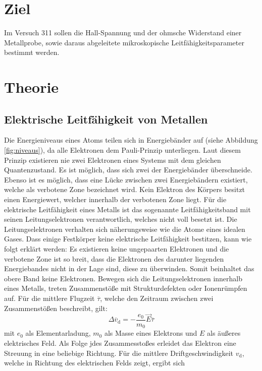 \section{Ziel}
\label{sec:Ziel}
Im Versuch 311 sollen die Hall-Spannung und der ohmsche Widerstand einer Metallprobe, sowie daraus abgeleitete mikroskopische Leitfähigkeitsparameter bestimmt werden.

\section{Theorie}
\label{sec:theorie}

\subsection{Elektrische Leitfähigkeit von Metallen}
Die Energieniveaus eines Atoms teilen sich in Energiebänder auf (siehe Abbildung \ref{fig:niveaus}), da alle Elektronen dem Pauli-Prinzip unterliegen. Laut diesem Prinzip existieren nie zwei Elektronen eines Systems mit dem gleichen Quantenzustand.
Es ist möglich, dass sich zwei der Energiebänder überschneide. Ebenso ist es möglich, dass eine Lücke zwischen zwei Energiebändern existiert, welche als verbotene Zone bezeichnet wird. Kein Elektron des Körpers besitzt einen Energiewert, welcher innerhalb der verbotenen Zone liegt.
Für die elektrische Leitfähigkeit eines Metalls ist das sogenannte Leitfähigkeitsband  mit seinen Leitungselektronen verantwortlich, welches nicht voll besetzt ist. Die Leitungselektronen verhalten sich näherungsweise wie die Atome eines idealen Gases. Dass einige Festkörper keine elektrische Leitfähigkeit bestitzen, kann wie folgt erklärt werden: Es existieren keine ungepaarten Elektronen und die verbotene Zone ist so breit, dass die Elektronen des darunter liegenden Energiebandes nicht in der Lage sind, diese zu überwinden. Somit beinhaltet das obere Band keine Elektronen.
Bewegen sich die Leitungselektronen innerhalb eines Metalls, treten Zusammenstöße mit Strukturdefekten oder Ionenrümpfen auf. Für die mittlere Flugzeit $\overline{\tau}$, welche den Zeitraum zwischen zwei Zusammenstößen beschreibt, gilt:
\begin{equation}
\Delta\overline{v}_\mathrm{d}=-\frac{e_0}{m_0}\vec{E} \overline{\tau}
\end{equation}
mit $e_0$ als Elementarladung, $m_0$ als Masse eines Elektrons und $E$ als äußeres elektrisches Feld. Als Folge jdes Zusammesstoßes erleidet das Elektron eine Streuung in eine beliebige Richtung. Für die mittlere Driftgeschwindigkeit $v_\mathrm{d}$, welche in Richtung des elektrischen Felds zeigt, ergibt sich
